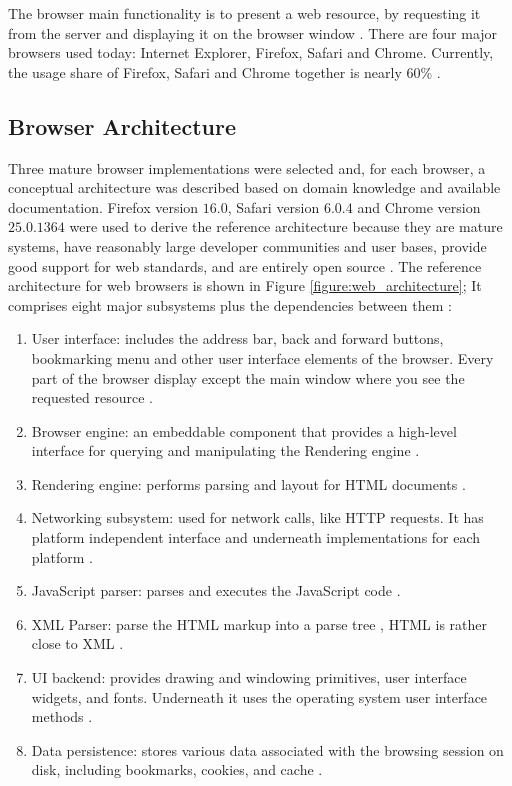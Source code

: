 The browser main functionality is to present a web resource, by requesting it from the server and displaying it on the browser window \cite{Traffic2013}. There are four major browsers used today: Internet Explorer, Firefox, Safari and Chrome. Currently, the usage share of Firefox, Safari and Chrome together is nearly 60\% \cite{Traffic2013}.


\subsection{Browser Architecture} %
\label{sub:basic_concepts:web:browser_architecture}

Three mature browser implementations were selected and, for each browser, a conceptual architecture was described based on domain knowledge and available documentation. Firefox version $16.0$, Safari version $6.0.4$ and Chrome version $25.0.1364$ were used to derive the reference architecture because they are mature systems, have reasonably large developer communities and user bases, provide good support for web standards, and are entirely open source \cite{WC2006,Grosskurth2005}. The reference architecture for web browsers is shown in Figure \ref{figure:web_architecture}; It comprises eight major subsystems plus the dependencies between them \cite{Grosskurth2005}:

\begin{enumerate}
  \item User interface: includes the address bar, back and forward buttons, bookmarking menu and other user interface elements of the browser. Every part of the browser display except the main window where you see the requested resource \cite{Grosskurth2005}.
  \item Browser engine: an embeddable component that provides a high-level interface for querying and manipulating the Rendering engine \cite{Grosskurth2005,Rocks2013}.
  \item Rendering engine: performs parsing and layout for HTML documents \cite{Grosskurth2005,Rocks2013}.
  \item Networking subsystem: used for network calls, like HTTP requests. It has platform independent interface and underneath implementations for each platform \cite{Grosskurth2005,Rocks2013}.
  \item JavaScript parser: parses and executes the JavaScript \cite{International2009} code \cite{Grosskurth2005}.
  \item XML Parser: parse the HTML markup into a parse tree \cite{Hickson2013}, HTML is rather close to XML \cite{Rocks2013,Hickson2013}.
  \item UI backend: provides drawing and windowing primitives, user interface widgets, and fonts. Underneath it uses the operating system user interface methods \cite{Grosskurth2005}.
  \item Data persistence: stores various data associated with the browsing session on disk, including bookmarks, cookies, and cache \cite{Grosskurth2005,Rocks2013}.
\end{enumerate}

